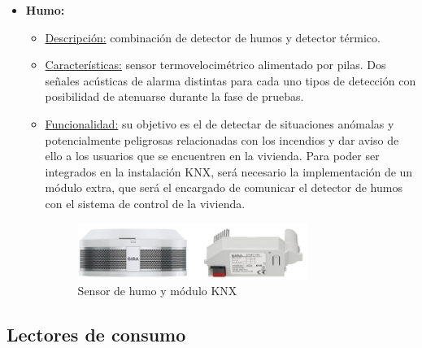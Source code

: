 \begin{itemize}
\item \textbf{Humo:} 
	\begin{itemize}
	\item\underline{Descripción:} combinación de detector de humos y detector térmico.
	\item \underline{Características:} sensor termovelocimétrico alimentado por pilas. Dos señales acústicas de alarma distintas para cada uno tipos de detección con posibilidad de atenuarse durante la fase de pruebas.
	\item \underline{Funcionalidad:} su objetivo es el de detectar de situaciones anómalas y potencialmente peligrosas relacionadas con los incendios y dar aviso de ello a los usuarios que se encuentren en la vivienda. Para poder ser integrados en la instalación KNX, será necesario la implementación de un módulo extra, que será el encargado de comunicar el detector de humos con el sistema de control de la vivienda.
	\begin{figure}[H]
	\centering
	\includegraphics[width=0.75\textwidth]{figures/sensor_humo.png}   
	\caption{Sensor de humo y módulo KNX}
	\label{fig:sensor_humo}
	\end{figure}
	\end{itemize} 
\end{itemize} 

\subsection{Lectores de consumo}

